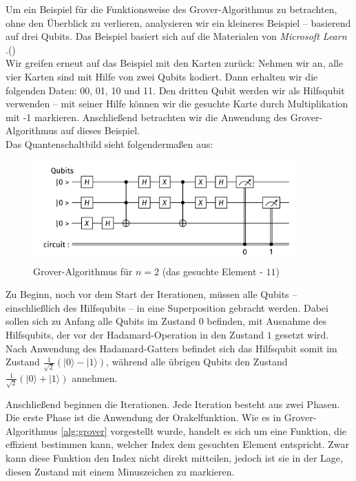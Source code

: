 Um ein Beispiel für die Funktionsweise des Grover-Algorithmus zu betrachten, ohne den Überblick zu verlieren, analysieren wir ein kleineres Beispiel – basierend auf drei Qubits. Das Beispiel basiert sich auf die Materialen von \textit{Microsoft Learn
}.(\cite{microsoft})\\ 

Wir greifen erneut auf das Beispiel mit den Karten zurück: Nehmen wir an, alle vier Karten sind mit Hilfe von zwei Qubits kodiert. Dann erhalten wir die folgenden Daten: 00, 01, 10 und 11. Den dritten Qubit werden wir als Hilfsqubit  verwenden – mit seiner Hilfe können wir die gesuchte Karte durch Multiplikation mit -1 markieren. Anschließend betrachten wir die Anwendung des Grover-Algorithmus auf dieses Beispiel.\\

Das Quantenschaltbild sieht folgendermaßen aus:
\begin{figure}[h!]
    \centering
    \includegraphics[width=0.9\textwidth]{images/basic-algorithms/3-qubits-grover.png}
    \caption{Grover-Algorithmus für $n=2$ (das gesuchte Element - $11$)}
    \label{fig:grover-three-bits}
\end{figure}

Zu Beginn, noch vor dem Start der Iterationen, müssen alle Qubits – einschließlich des Hilfsqubits – in eine Superposition gebracht werden. Dabei sollen sich zu Anfang alle Qubits im Zustand $0$ befinden, mit Ausnahme des Hilfsqubits, der vor der Hadamard-Operation in den Zustand $1$ gesetzt wird.\\

Nach Anwendung des Hadamard-Gatters befindet sich das Hilfsqubit somit im Zustand $\frac{1}{\sqrt{2}}(|0\rangle - |1\rangle)$, während alle übrigen Qubits den Zustand $\frac{1}{\sqrt{2}}(|0\rangle + |1\rangle)$ annehmen.

Anschließend beginnen die Iterationen. Jede Iteration besteht aus zwei Phasen. Die erste Phase ist die Anwendung der Orakelfunktion. Wie es in Grover-Algorithmus \ref{alg:grover} vorgestellt wurde, handelt es sich um eine Funktion, die effizient bestimmen kann, welcher Index dem gesuchten Element entspricht. Zwar kann diese Funktion den Index nicht direkt mitteilen, jedoch ist sie in der Lage, diesen Zustand mit einem Minuszeichen zu markieren.

